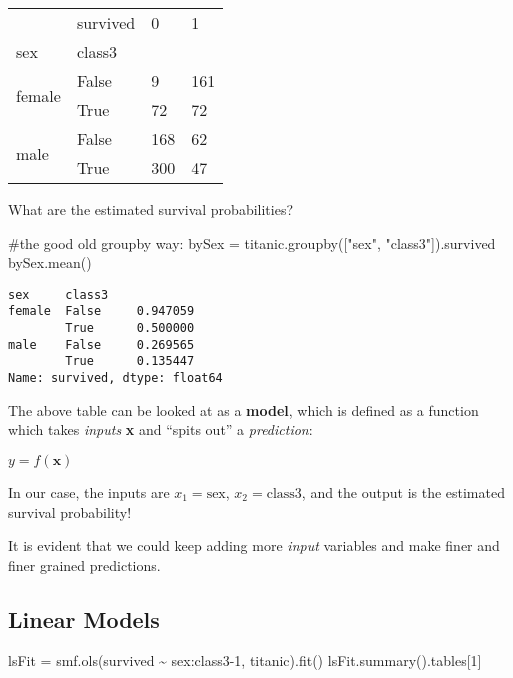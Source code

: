 \documentclass[
  letterpaper,
  DIV=11,
  numbers=noendperiod]{scrreprt}
\newenvironment{Shaded}{\begin{snugshade}}{\end{snugshade}}
\newcommand{\CommentTok}[1]{\textcolor[rgb]{0.37,0.37,0.37}{#1}}
\newcommand{\DecValTok}[1]{\textcolor[rgb]{0.68,0.00,0.00}{#1}}
\newcommand{\NormalTok}[1]{\textcolor[rgb]{0.00,0.23,0.31}{#1}}
\newcommand{\OperatorTok}[1]{\textcolor[rgb]{0.37,0.37,0.37}{#1}}
\newcommand{\StringTok}[1]{\textcolor[rgb]{0.13,0.47,0.30}{#1}}
\begin{document}
\begin{longtable}[]{@{}llll@{}}
\toprule()
& survived & 0 & 1 \\
sex & class3 & & \\
\midrule()
\endhead
\multirow{2}{*}{female} & False & 9 & 161 \\
& True & 72 & 72 \\
\multirow{2}{*}{male} & False & 168 & 62 \\
& True & 300 & 47 \\
\bottomrule()
\end{longtable}

What are the estimated survival probabilities?

\begin{Shaded}
\begin{Highlighting}[]
\CommentTok{\#the good old groupby way:}
\NormalTok{bySex }\OperatorTok{=}\NormalTok{ titanic.groupby([}\StringTok{"sex"}\NormalTok{, }\StringTok{"class3"}\NormalTok{]).survived}
\NormalTok{bySex.mean()}
\end{Highlighting}
\end{Shaded}

\begin{verbatim}
sex     class3
female  False     0.947059
        True      0.500000
male    False     0.269565
        True      0.135447
Name: survived, dtype: float64
\end{verbatim}

The above table can be looked at as a \textbf{model}, which is defined
as a function which takes \emph{inputs} \textbf{x} and ``spits out'' a
\emph{prediction}:

\(y = f(\mathbf{x})\)

In our case, the inputs are \(x_1=\text{sex}\), \(x_2=\text{class3}\),
and the output is the estimated survival probability!

It is evident that we could keep adding more \emph{input} variables and
make finer and finer grained predictions.

\hypertarget{linear-models}{%
\subsection{Linear Models}\label{linear-models}}

\begin{Shaded}
\begin{Highlighting}[]
\NormalTok{lsFit }\OperatorTok{=}\NormalTok{ smf.ols(}\StringTok{\textquotesingle{}survived \textasciitilde{} sex:class3{-}1\textquotesingle{}}\NormalTok{, titanic).fit()}
\NormalTok{lsFit.summary().tables[}\DecValTok{1}\NormalTok{]}
\end{Highlighting}
\end{Shaded}
\end{document}
